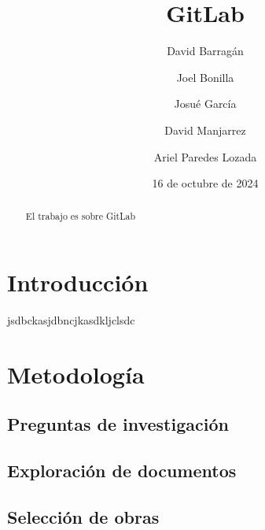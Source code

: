 \documentclass[runningheads]{llncs}
\begin{document}
\title{GitLab}
\author{David Barragán \and
        Joel Bonilla \and
        Josué García \and
        David Manjarrez \and
        Ariel Paredes Lozada
        }
\date{16 de octubre de 2024}

\maketitle
\begin{abstract}
        El trabajo es sobre GitLab
\end{abstract}
\section{Introducción}
jsdbckasjdbncjkasdkljclsdc\cite{safari2020analysis}
\section{Metodología}
\subsection{Preguntas de investigación}
\subsection{Exploración de documentos}
\subsection{Selección de obras}
\end{document}
